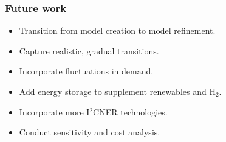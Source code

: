 \begin{frame}
  \frametitle{Future work}
   \begin{itemize}
   
   \item Transition from model creation to model refinement.
   
   \item Capture realistic, gradual transitions.
   
   \item Incorporate fluctuations in demand.
   
   \item Add energy storage to supplement renewables and H$_2$.
   
   \item Incorporate more I$^2$CNER technologies.
   
   \item Conduct sensitivity and cost analysis.
   
   \end{itemize}

\end{frame}